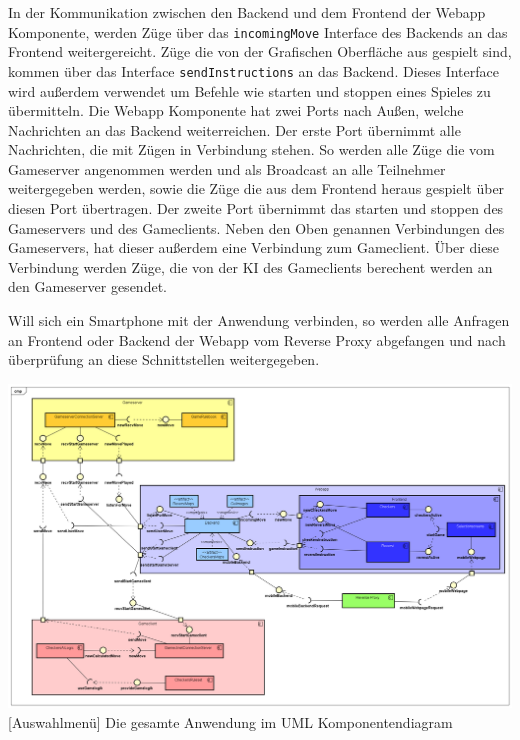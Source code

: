 \documentclass[12pt,a4paper,bibliography=totocnumbered,listof=totocnumbered]{article}
\begin{document}
In der Kommunikation zwischen den Backend und dem Frontend der Webapp Komponente, werden Züge über das \texttt{incomingMove} Interface des Backends an das Frontend
weitergereicht. Züge die von der Grafischen Oberfläche aus gespielt sind, kommen über das Interface \texttt{sendInstructions} an das Backend. Dieses
Interface wird außerdem verwendet um Befehle wie starten und stoppen eines Spieles zu übermitteln. Die Webapp Komponente hat zwei Ports nach Außen, 
welche Nachrichten an das Backend
weiterreichen. Der erste Port übernimmt alle Nachrichten, die mit Zügen in Verbindung stehen. So werden alle Züge die vom Gameserver angenommen werden
und als Broadcast an alle Teilnehmer weitergegeben werden, sowie die Züge die aus dem Frontend heraus gespielt über diesen Port übertragen.
Der zweite Port übernimmt das starten und stoppen des Gameservers und des Gameclients. 
Neben den Oben genannen Verbindungen des Gameservers, hat dieser außerdem eine Verbindung zum Gameclient. Über diese Verbindung werden Züge, die von der 
KI des Gameclients berechent werden an den Gameserver gesendet.

Will sich ein Smartphone mit der Anwendung verbinden, so werden alle Anfragen an Frontend oder Backend der Webapp vom Reverse Proxy abgefangen und 
nach überprüfung an diese Schnittstellen weitergegeben.


\vspace{1em}
\begin{minipage}{\linewidth}
	\centering
	\includegraphics[width=1.0\linewidth]{pics/Komponentendiagram.png}
	[Auswahlmenü]{ Die gesamte Anwendung im UML Komponentendiagram}
	\label{fig:ComponentDiagram}
\end{minipage}
\end{document}
